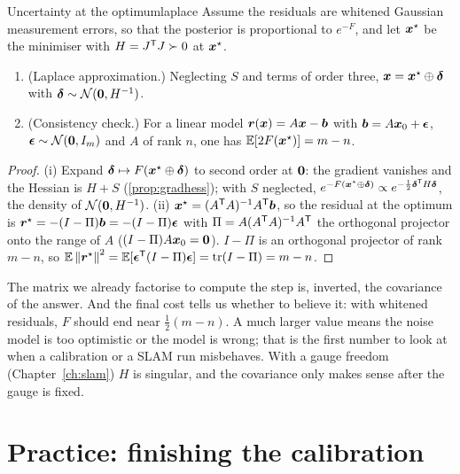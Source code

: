 \begin{proposition}{Uncertainty at the optimum}{laplace}
Assume the residuals are whitened Gaussian measurement errors, so that
the posterior is proportional to $e^{-F}$, and let $\bm{x}^\star$ be the
minimiser with $H=J^{\mathsf{T}} J\succ0$ at $\bm{x}^\star$.
\begin{enumerate}[label=(\roman*),nosep]
\item (Laplace approximation.) Neglecting $S$ and terms of order three,
  $\bm{x}=\bm{x}^\star\oplus\bm{\delta}$ with $\bm{\delta}\sim\mathcal{N}(\bm{0},
  H^{-1})$.
\item (Consistency check.) For a linear model $\bm{r}(\bm{x})=A\bm{x}-\bm{b}$
  with $\bm{b}=A\bm{x}_0+\bm{\epsilon}$, $\bm{\epsilon}\sim\mathcal{N}(\bm{0},
  I_m)$ and $A$ of rank $n$, one has $\mathbb{E}[2F(\bm{x}^\star)]=m-n$.
\end{enumerate}
\end{proposition}

\begin{proof}
(i) Expand $\bm{\delta}\mapsto F(\bm{x}^\star\oplus\bm{\delta})$ to second
order at $\bm{0}$: the gradient vanishes and the Hessian is $H+S$
(\cref{prop:gradhess}); with $S$ neglected,
$e^{-F(\bm{x}^\star\oplus\bm{\delta})}\propto e^{-\frac12\bm{\delta}^{\mathsf{T}}
H\bm{\delta}}$, the density of $\mathcal{N}(\bm{0},H^{-1})$.
(ii) $\bm{x}^\star=(A^{\mathsf{T}} A)^{-1}A^{\mathsf{T}}\bm{b}$, so the residual at the optimum
is $\bm{r}^\star=-(I-\Pi)\bm{b}=-(I-\Pi)\bm{\epsilon}$ with
$\Pi=A(A^{\mathsf{T}} A)^{-1}A^{\mathsf{T}}$ the orthogonal projector onto the range of $A$
($(I-\Pi)A\bm{x}_0=\bm{0}$). $I-\Pi$ is an orthogonal projector of rank
$m-n$, so $\mathbb{E}\left\lVert \bm{r}^\star\right\rVert^2=\mathbb{E}[\bm{\epsilon}^{\mathsf{T}}(I-\Pi)
\bm{\epsilon}]=\operatorname{tr}(I-\Pi)=m-n$.
\end{proof}

\begin{inwords}
The matrix we already factorise to compute the step is, inverted, the
covariance of the answer. And the final cost tells us whether to believe
it: with whitened residuals, $F$ should end near $\tfrac12(m-n)$. A much
larger value means the noise model is too optimistic or the model is
wrong; that is the first number to look at when a calibration or a SLAM
run misbehaves. With a gauge freedom (Chapter~\ref{ch:slam}) $H$ is
singular, and the covariance only makes sense after the gauge is fixed.
\end{inwords}

\section{Practice: finishing the calibration}

